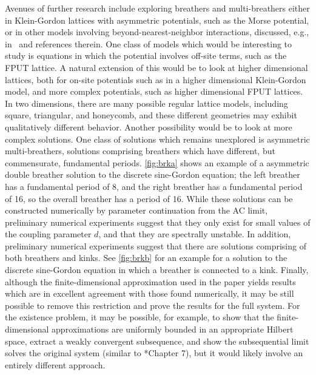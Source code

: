 \documentclass[12pt,reqno]{amsart}
\theoremstyle{definition}
\begin{document}
Avenues of further research include exploring breathers and multi-breathers either in Klein-Gordon lattices with asymmetric potentials, such as the Morse potential, or in other models 
involving beyond-nearest-neighbor interactions, discussed, e.g., in~\cite{PENATI201992} and references therein. One class of models which would be interesting to study is equations in which the potential involves off-site terms, such as the FPUT lattice. A natural extension of this would be to look at higher dimensional lattices, both for on-site potentials such as in a higher dimensional Klein-Gordon model, and more complex potentials, such as higher dimensional FPUT lattices. In two dimensions, there are many possible regular lattice models, including square, triangular, and honeycomb, and these different geometries may exhibit qualitatively different behavior. Another possibility would be to look at more complex solutions. One class of solutions which remains unexplored is asymmetric multi-breathers, solutions comprising breathers which have different, but commensurate, fundamental periods. \cref{fig:brka} shows an example of a asymmetric double breather solution to the discrete sine-Gordon equation; the left breather has a fundamental period of 8, and the right breather has a fundamental period of 16, so the overall breather has a period of 16. While these solutions can be constructed numerically by parameter continuation from the AC limit, preliminary numerical experiments suggest that they only exist for small values of the coupling parameter $d$, and that they are spectrally unstable.
In addition, preliminary numerical experiments suggest that there are solutions comprising of both breathers and kinks. See \cref{fig:brkb} for an example for a solution to the discrete sine-Gordon equation in which a breather is connected to a kink. Finally, although the finite-dimensional approximation used in the paper yields results which are in excellent agreement with those found numerically, it may be still possible to remove this restriction and prove the results for the full system. For the existence problem, it may be possible, for example, to show that the finite-dimensional approximations are uniformly bounded in an appropriate Hilbert space, extract a weakly convergent subsequence, and show the subsequential limit solves the original system (similar to \cite{evansPDE}*{Chapter 7}), but it would likely involve an entirely different approach.
\end{document}
